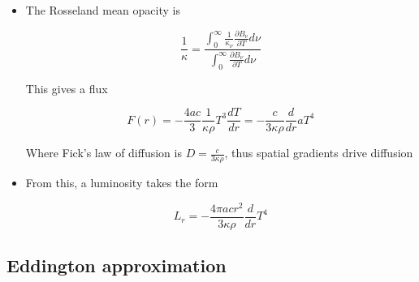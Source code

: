 \documentclass{article}
\begin{document}
\begin{itemize}
    \begin{equation}
        \implies \tau_\nu(s) = \tau_{\nu, 0} - \int_{s_0}^{s_1}\kappa_\nu \rho ds
    \end{equation}

    Using this, the equation of radiative transfer is 

    \begin{equation}
        \frac{\mu dI_\nu(T,\mu)}{d\tau_\nu} = I_\nu(T,\mu) - S_\nu(\tau,\mu)
    \end{equation}

    In stellar interiors, where $\tau > 1$,

    \begin{equation}
        F_\nu = - \frac{4\pi}{3}\frac{1}{\rho}\frac{dT}{dr}\frac{1}{\kappa_\nu}\frac{\partial B_\nu}{\partial T}
    \end{equation}

    \item The Rosseland mean opacity is 

    \begin{equation}
        \frac{1}{\kappa} = \frac{\int_0^\infty \frac{1}{\kappa_\nu}\frac{\partial B_\nu}{\partial T}d\nu}{\int_0^\infty\frac{\partial B_\nu}{\partial T}d\nu}
    \end{equation}

    This gives a flux 

    \begin{equation}
        F(r) = -\frac{4ac}{3}\frac{1}{\kappa\rho}T^3\frac{dT}{dr} = -\frac{c}{3\kappa\rho}\frac{d}{dr}aT^4
    \end{equation}

    Where Fick's law of diffusion is $D = \frac{c}{3\kappa\rho}$, thus spatial gradients drive diffusion

    \item From this, a luminosity takes the form

    \begin{equation}
        L_r = -\frac{4\pi acr^2}{3\kappa\rho}\frac{d}{dr}T^4
    \end{equation}
\end{itemize}


\subsection{Eddington approximation}
\end{document}
